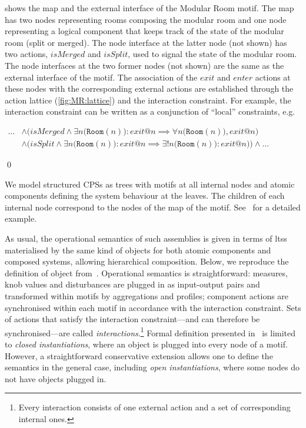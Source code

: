 \documentclass[runningheads]{llncs}
\makeatletter
\newcommand{\mdash}[1][]{{#1}---{#1}}
\newcommand{\eg}[1][\@ ]{e.g.{#1}}
\newcommand{\actionat}[2]{#2@#1}
\newcommand{\actionname}[1]{\mathit{#1}}
\newcommand{\predicatename}[1]{\mathtt{#1}}
\makeatother
\begin{document}
\begin{example}
  \label{ex:ModularRoom}
   shows the map and the external interface of the Modular Room motif.  
  The map has two nodes representing rooms composing the modular room and one node representing a logical component that keeps track of the state of the modular room (split or merged).  The node interface at the latter node (not shown) has two actions, $\actionname{isMerged}$ and $\actionname{isSplit}$, used to signal the state of the modular room.  The node interfaces at the two former nodes (not shown) are the same as the external interface of the motif.  The association of the $\actionname{exit}$ and $\actionname{enter}$ actions at these nodes with the corresponding external actions are established through the action lattice (\cref{fig:MR:lattice}) and the interaction constraint.  For example, the interaction constraint can be written as a conjunction of ``local'' constraints, \eg

  \noindent
  \parbox[b]{0.9\columnwidth}{%
    $\begin{aligned}
      \dots &\land \Big(\actionname{isMerged} \land \exists n \bigl(\predicatename{Room}(n)\bigr): \actionat{n}{\actionname{exit}} \implies \forall n \bigl(\predicatename{Room}(n)\bigr), \actionat{n}{\actionname{exit}}\Big)\\
      &\land \Big(\actionname{isSplit} \land \exists n \bigl(\predicatename{Room}(n)\bigr): \actionat{n}{\actionname{exit}} \implies \exists! n \bigl(\predicatename{Room}(n)): \actionat{n}{\actionname{exit}}\bigr)\Big)
      \land \dots {}
    \end{aligned}$

  }
  \qed
\end{example}

We model structured CPSs as trees with motifs at all internal nodes and atomic components defining the system behaviour at the leaves. The children of each internal node correspond to the nodes of the map of the motif.  See~\cite{BCK26-Motifs} for a detailed example.

As usual, the operational semantics of such assemblies is given in terms of \glspl{lts} materialised by the same kind of objects for both atomic components and composed systems, allowing hierarchical composition.  Below, we reproduce the definition of object from~\cite{BCK26-Motifs}. 
%
Operational semantics is straightforward: measures, knob values and disturbances are plugged in as input-output pairs and transformed within motifs by aggregations and profiles; component actions are synchronised within each motif in accordance with the interaction constraint.  Sets of actions that satisfy the interaction constraint\mdash and can therefore be synchronised\mdash are called \emph{interactions}.\footnote{%
%
Every interaction consists of one external action and a set of corresponding internal ones. 
%
} Formal definition presented in~\cite{BCK26-Motifs} is limited to \emph{closed instantiations}, where an object is plugged into every node of a motif.  However, a straightforward conservative extension allows one to define the semantics in the general case, including \emph{open instantiations}, where some nodes do not have objects plugged in.
\end{document}
